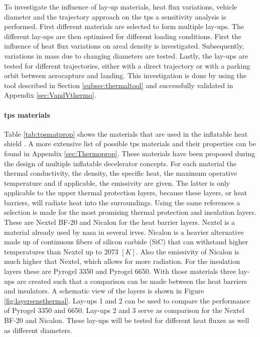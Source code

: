 To investigate the influence of lay-up materials, heat flux variations, vehicle diameter and the trajectory approach on the \gls{tps} a sensitivity analysis is performed. First different materials are selected to form multiple lay-ups. The different lay-ups are then optimised for different loading conditions. First the influence of heat flux variations on areal density is investigated. Subsequently, variations in mass due to changing diameters are tested. Lastly, the lay-ups are tested for different trajectories, either with a direct trajectory or with a parking orbit between aerocapture and landing. This investigation is done by using the tool described in Section \ref{subsec:thermaltool} and successfully validated in Appendix \ref{sec:VandVthermo}.

\paragraph{\gls{tps} materials}
Table \ref{tab:tpsmatprop} shows the materials that are used in the inflatable heat shield \cite{Corso2009,Corso2011,DuPont2011,Smith2011,Nye,Zinkle1998}. A more extensive list of possible \gls{tps} materials and their properties can be found in Appendix \ref{sec:Thermoprop}. These materials have been proposed during the design of multiple inflatable decelerator concepts. For each material the thermal conductivity, the density, the specific heat, the maximum operative temperature and if applicable, the emissivity are given. The latter is only applicable to the upper thermal protection layers, because these layers, or heat barriers, will radiate heat into the surroundings.
\newline\newline
Using the same references a selection is made for the most promising thermal protection and insulation layers. These are Nextel BF-20 and Nicalon for the heat barrier layers. Nextel is a material already used by \gls{nasa} in several \gls{irve}s. Nicalon is a heavier alternative made up of continuous fibers of silicon carbide (SiC) that can withstand higher temperatures than Nextel up to 2073 $\left[K\right]$. Also the emissivity of Nicalon is much higher that Nextel, which allows for more radiation. For the insulation layers these are Pyrogel 3350 and Pyrogel 6650. With those materials three lay-ups are created such that a comparison can be made between the heat barriers and insulators. A schematic view of the layers is shown in Figure \ref{fig:layersensthermal}. Lay-ups 1 and 2 can be used to compare the performance of Pyrogel 3350 and 6650. Lay-ups 2 and 3 serve as comparison for the Nextel BF-20 and Nicalon. These lay-ups will be tested for different heat fluxes as well as different diameters.

